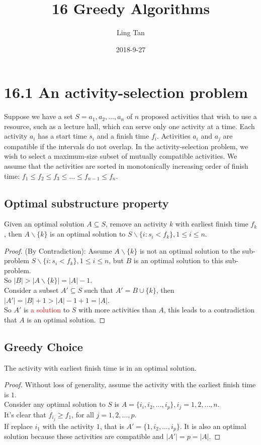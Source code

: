 \documentclass[a4paper]{article}
\title{16 Greedy Algorithms}
\author{Ling Tan}
\date{2018-9-27}
\begin{document}

\section*{16.1 An activity-selection problem}
Suppose we have a set $S={a_1,a_2, \dots, a_n}$ of $n$ proposed activities that wish to use a resource, such as a lecture hall, which can serve only one activity at a time. Each activity $a_i$ has a start time $s_i $ and a finish time $f_i$. Activities $a_i$ and $a_j$ are compatible if the intervals do not overlap. In the activity-selection problem, we wish to select a \color{red}maximum-size \color{black} subset of mutually compatible activities. We assume that the activities are sorted in monotonically increasing order of finish time: $f_1\leq f_2 \leq f_3 \leq \dots \leq f_{n-1} \leq f_n$.

\subsection*{Optimal substructure property}
Given an optimal solution $A\subseteq S$, remove an activity $k$ with earliest finish time $f_k$, then $A\backslash\{k\}$ is an optimal solution to $S\backslash\{i:s_i < f_k\}, 1\leq i\leq n$.
\begin{proof}
(By Contradiction): Assume $A\backslash\{k\}$ is not an optimal solution to the sub-problem $S\backslash\{i:s_i < f_k\}, 1\leq i\leq n$, but $B$ is an optimal solution to this sub-problem.\\
So $|B|>|A\backslash\{k\}|=|A|-1$.\\
Consider a subset $A'\subseteq S$ such that $A'=B\cup \{k\}$, then $|A'|=|B|+1>|A|-1+1=|A|$.\\
So $A'$ is \textcolor{red}{a solution} to $S$ with more activities than $A$, this leads to a contradiction that $A$ is an optimal solution. 
\end{proof}

\subsection*{Greedy Choice}
The activity with earliest finish time is in an optimal solution.
\begin{proof}Without loss of generality, assume the activity with the earliest finish time is $1$.\\
Consider any optimal solution to $S$ is $A=\{i_i, i_2,\dots, i_p\}, i_j =1,2,\dots, n$.\\
It's clear that $f_{i_j} \geq f_1$, for all $j=1,2,\dots,p$.\\
If replace $i_1$ with the activity $1$, that is $A'= \{1, i_2, \dots, i_p\}$. It is also an optimal solution because these activities are compatible and $|A'|=p=|A|$.
\end{proof}
\end{document}
